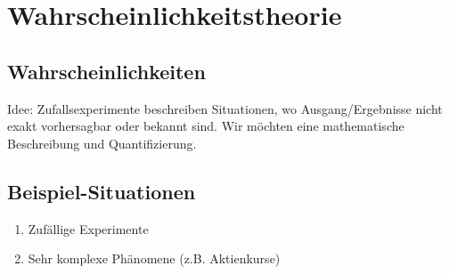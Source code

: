 \documentclass[10pt]{article}
\newcommand{\enumstart}{\begin{enumerate}}
\newcommand{\enumend}{\end{enumerate}}
\begin{document}
\section{Wahrscheinlichkeitstheorie}
\subsection{Wahrscheinlichkeiten}
Idee: Zufallsexperimente beschreiben Situationen, wo Ausgang/Ergebnisse nicht exakt vorhersagbar oder bekannt sind. Wir möchten eine mathematische Beschreibung und Quantifizierung.

\subsection{Beispiel-Situationen}
\enumstart
	\item Zufällige Experimente
	\item Sehr komplexe Phänomene (z.B. Aktienkurse)
\enumend
\end{document}
